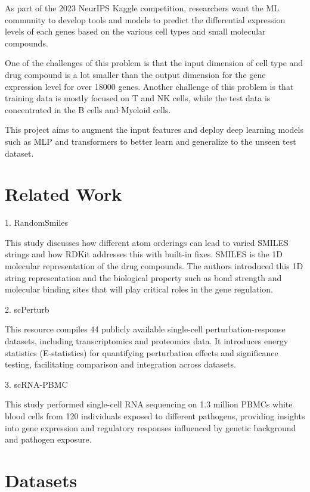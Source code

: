 \documentclass[11pt, oneside]{article}   	%
\begin{document}
As part of the 2023 NeurIPS Kaggle competition, researchers want the ML community to develop tools and models to predict the differential expression levels of each genes based on the various cell types and small molecular compounds. 

One of the challenges of this problem is that the input dimension of cell type and drug compound is a lot smaller than the output dimension for the gene expression level for over 18000 genes. Another challenge of this problem is that training data is mostly focused on T and NK cells, while the test data is concentrated in the B cells and Myeloid cells. 

This project aims to augment the input features and deploy deep learning models such as MLP and transformers to better learn and generalize to the unseen test dataset. 


\section*{Related Work}

1. RandomSmiles  \cite{RandomSmiles} 

This study discusses how different atom orderings can lead to varied SMILES strings and how RDKit addresses this with built-in fixes. SMILES is the 1D molecular representation of the drug compounds. The authors introduced this 1D string representation and the biological property such as bond strength and molecular binding sites that will play critical roles in the gene regulation. 


2. scPerturb \cite{scPerturb}

This resource compiles 44 publicly available single-cell perturbation-response datasets, including transcriptomics and proteomics data. It introduces energy statistics (E-statistics) for quantifying perturbation effects and significance testing, facilitating comparison and integration across datasets.

3. scRNA-PBMC \cite{scRNA-PBMC}

This study performed single-cell RNA sequencing on 1.3 million PBMCs white blood cells from 120 individuals exposed to different pathogens, providing insights into gene expression and regulatory responses influenced by genetic background and pathogen exposure.




\section*{Datasets}
\end{document}
